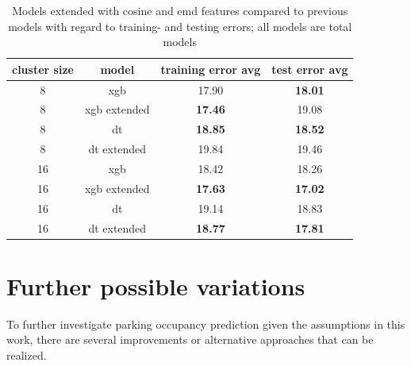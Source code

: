 {\begin{table}[!ht]
	{\color{green}
	\footnotesize
	\begin{tabular}{ | c | c | c | c | }
		\hline		
		\textbf{cluster size}  & \textbf{model} & \textbf{training error avg} & \textbf{test error avg} \\ \hline
		8 & {xgb} & 17.90 & \textbf{18.01} \\ \hline
		8 & {xgb extended} & \textbf{17.46} & 19.08 \\ \hline \hline
		8 & {dt} & \textbf{18.85} & \textbf{18.52} \\ \hline
		8 & {dt extended} & 19.84 & 19.46 \\ \hline \hline
		16 & {xgb} & 18.42 & 18.26 \\ \hline
		16 & {xgb extended} & \textbf{17.63} & \textbf{17.02} \\ \hline \hline
		16 & {dt} & 19.14 & 18.83 \\ \hline
		16 & {dt extended} & \textbf{18.77} & \textbf{17.81} \\ \hline
	\end{tabular}}
	\caption{\color{green} Models extended with cosine and emd features compared to previous models with regard to training- and testing errors; all models are total models}
	\label{extensions:extended_models_comparison}
\end{table}

\section{Further possible variations}
\label{conclusion:future_work}
} %
To further investigate parking occupancy prediction given the assumptions in this work, there are several improvements or alternative approaches that can be realized.

